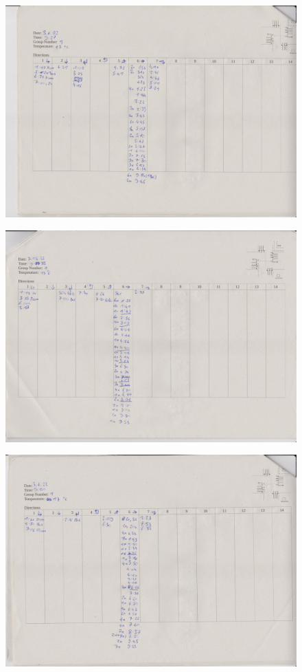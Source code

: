 \begin{figure}[htbp]
  \includegraphics[width=\linewidth]{scans/Bild (10).jpg}
\end{figure}

\begin{figure}[htbp]
  \includegraphics[width=\linewidth]{scans/Bild (11).jpg}
\end{figure}

\begin{figure}[htbp]
  \includegraphics[width=\linewidth]{scans/Bild (12).jpg}
\end{figure}

